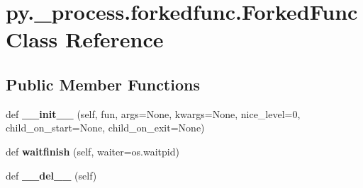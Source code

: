 \hypertarget{classpy_1_1__process_1_1forkedfunc_1_1_forked_func}{}\section{py.\+\_\+process.\+forkedfunc.\+Forked\+Func Class Reference}
\label{classpy_1_1__process_1_1forkedfunc_1_1_forked_func}
\subsection*{Public Member Functions}
\begin{DoxyCompactItemize}
\item 
\mbox{\label{classpy_1_1__process_1_1forkedfunc_1_1_forked_func_ac8ccf658fcfe66f5926db0d78ad4b761}} 
def {\bfseries \+\_\+\+\_\+init\+\_\+\+\_\+} (self, fun, args=None, kwargs=None, nice\+\_\+level=0, child\+\_\+on\+\_\+start=None, child\+\_\+on\+\_\+exit=None)
\item 
\mbox{\label{classpy_1_1__process_1_1forkedfunc_1_1_forked_func_a5e4099659be066ccf4dd6ac621ef1102}} 
def {\bfseries waitfinish} (self, waiter=os.\+waitpid)
\item 
\mbox{\label{classpy_1_1__process_1_1forkedfunc_1_1_forked_func_ac6ce53b5007635af88ca0f60000ba374}} 
def {\bfseries \+\_\+\+\_\+del\+\_\+\+\_\+} (self)
\end{DoxyCompactItemize}
